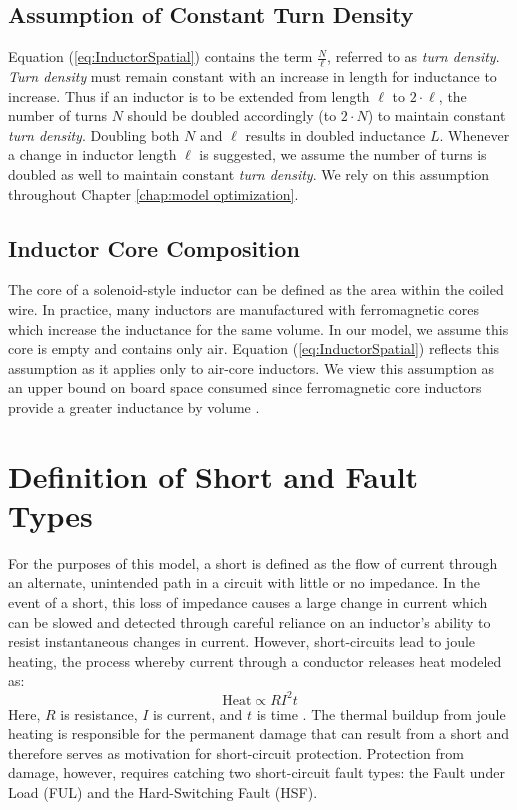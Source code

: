 \documentclass[11pt,oneside]{report}
\begin{document}
    \subsection{Assumption of Constant Turn Density} \label{ssec:Assumption of Constant}
    Equation (\ref{eq:InductorSpatial}) contains the term $\frac{N}{\ell}$, referred to as \textit{turn density}. \textit{Turn density} must remain constant with an increase in length for inductance to increase. Thus if an inductor is to be extended from length $\ell$ to $2\cdot \ell$, the number of turns $N$ should be doubled accordingly (to $2\cdot N$) to maintain constant \textit{turn density}. Doubling both $N$ and $\ell$ results in doubled inductance $L$. Whenever a change in inductor length $\ell$ is suggested, we assume the number of turns is doubled as well to maintain constant \textit{turn density}. We rely on this assumption throughout Chapter \ref{chap:model optimization}.
    \subsection{Inductor Core Composition}
    The core of a solenoid-style inductor can be defined as the area within the coiled wire. In practice, many inductors are manufactured with ferromagnetic cores which increase the inductance for the same volume. In our model, we assume this core is empty and contains only air. Equation (\ref{eq:InductorSpatial}) reflects this assumption as it applies only to air-core inductors. We view this assumption as an upper bound on board space consumed since ferromagnetic core inductors provide a greater inductance by volume \cite{NiFe}.
    
    \section{Definition of Short and Fault Types}
    For the purposes of this model, a short is defined as the flow of current through an alternate, unintended path in a circuit with little or no impedance. In the event of a short, this loss of impedance causes a large change in current which can be slowed and detected through careful reliance on an inductor's ability to resist instantaneous changes in current. However, short-circuits lead to joule heating, the process whereby current through a conductor releases heat modeled as:
    \begin{equation}\label{eq:JouleHeating}
    \text{Heat} \propto R I^{2} t
    \end{equation}
    Here, $R$ is resistance, $I$ is current, and $t$ is time \cite{uniphy}. The thermal buildup from joule heating is responsible for the permanent damage that can result from a short and therefore serves as motivation for short-circuit protection. Protection from damage, however, requires catching two short-circuit fault types: the Fault under Load (FUL) and the Hard-Switching Fault (HSF).
    
\end{document}
